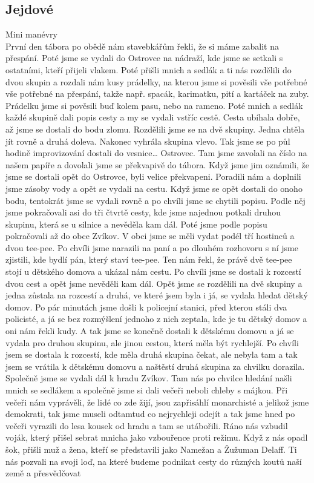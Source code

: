 \subsection*{Jejdové} %
\label{sub:jejdové}

\begin{multicols}{2}
	


Mini manévry\\
První den tábora po obědě nám stavebkářům řekli, že si máme zabalit na přespání. Poté jsme se vydali do Ostrovce na nádraží, kde jsme se setkali s ostatními, kteří přijeli vlakem. Poté přišli mnich a sedlák a ti nás rozdělili do dvou skupin a rozdali nám kusy prádelky, na kterou jsme si pověsili vše potřebné vše potřebné na přespání, takže např. spacák, karimatku, pití a kartáček na zuby. Prádelku jsme si pověsili buď kolem pasu, nebo na rameno. Poté mnich a sedlák každé skupině dali popis cesty a my se vydali vstříc cestě. Cesta ubíhala dobře, až jsme se dostali do bodu zlomu. Rozdělili jsme se na dvě skupiny. Jedna chtěla jít rovně a druhá doleva. Nakonec vyhrála skupina vlevo. Tak jsme se po půl hodině improvizování dostali do vesnice… Ostrovec. Tam jsme zavolali na číslo na našem papíře a dovolali jsme se překvapivě do tábora. Když jsme jim oznámili, že jsme se dostali opět do Ostrovce, byli velice překvapeni. Poradili nám a doplnili jsme zásoby vody a opět se vydali na cestu. Když jsme se opět dostali do onoho bodu, tentokrát jsme se vydali rovně a po chvíli jsme se chytili popisu. Podle něj jsme pokračovali asi do tři čtvrtě cesty, kde jsme najednou potkali druhou skupinu, která se u silnice a nevěděla kam dál. Poté jsme podle popisu pokračovali až do obce Zvíkov. V obci jsme se měli vydat podél tří hostinců a dvou tee-pee. Po chvíli jsme narazili na paní a po dlouhém rozhovoru s ní jsme zjistili, kde bydlí pán, který staví tee-pee. Ten nám řekl, že právě dvě tee-pee stojí u dětského domova a ukázal nám cestu. Po chvíli jsme se dostali k rozcestí dvou cest a opět jsme nevěděli kam dál. Opět jsme se rozdělili na dvě skupiny a jedna zůstala na rozcestí a druhá, ve které jsem byla i já, se vydala hledat dětský domov. Po pár minutách jsme došli k policejní stanici, před kterou stáli dva policisté, a já se bez rozmýšlení jednoho z nich zeptala, kde je tu dětský domov a oni nám řekli kudy. A tak jsme se konečně dostali k dětskému domovu a já se vydala pro druhou skupinu, ale jinou cestou, která měla být rychlejší. Po chvíli jsem se dostala k rozcestí, kde měla druhá skupina čekat, ale nebyla tam a tak jsem se vrátila k dětskému domovu a naštěstí druhá skupina za chvilku dorazila. Společně jsme se vydali dál k hradu Zvíkov. Tam nás po chvilce hledání našli mnich se sedlákem a společně jsme si dali večeři neboli chleby s májkou. Při večeři nám vyprávěli, že lidé co zde žijí, jsou zapřisáhlí monarchisté a jelikož jsme demokrati, tak jsme museli odtamtud co nejrychleji odejít a tak jsme hned po večeři vyrazili do lesa kousek od hradu a tam se utábořili. Ráno nás vzbudil voják, který přišel sebrat mnicha jako vzbouřence proti režimu. Když z nás opadl šok, přišli muž a žena, kteří se představili jako Namežan a Žužuman Delaff. Ti nás pozvali na svoji loď, na které budeme podnikat cesty do různých koutů naší země a přesvědčovat 
\end{multicols}
